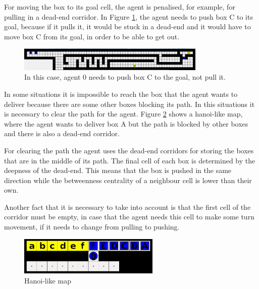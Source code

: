 For moving the box to its goal cell, the agent is penalised, for example, for pulling in a dead-end corridor.
In Figure \ref{fig:heuristics1}, the agent needs to push box C to its goal, because if it pulls it, it would
be stuck in a dead-end and it would have to move box C from its goal, in order to be able to get out.

\begin{figure}[htb]
\begin{center}
 \includegraphics[width=0.8\textwidth]{figures/heuristics1.png}
 \caption{In this case, agent 0 needs to push box C to the goal, not pull it.}
 \label{fig:heuristics1}
\end{center}
\end{figure}


In some situations it is impossible to reach the box that the agent wants to deliver because there are some
other boxes blocking its path. In this situations it is necessary to clear the path for the agent. Figure
\ref{fig:heuristics2} shows a hanoi-like map, where the agent wants to deliver box A but the path is blocked
by other boxes and there is also a dead-end corridor.

For clearing the path the agent uses the dead-end corridors for storing the boxes that are in the middle of
its path. The final cell of each box is determined by the deepness of the dead-end. This means that the box is
pushed in the same direction while the betweenness centrality of a neighbour cell is lower than their own.

Another fact that it is necessary to take into account is that the first cell of the corridor must be empty,
in case that the agent needs this cell to make some turn movement, if it needs to change from pulling to
pushing.

\begin{figure}[htb]
\begin{center}
 \includegraphics[width=0.6\textwidth]{figures/heuristics2.png}
 \caption{Hanoi-like map}
 \label{fig:heuristics2}
\end{center}
\end{figure}